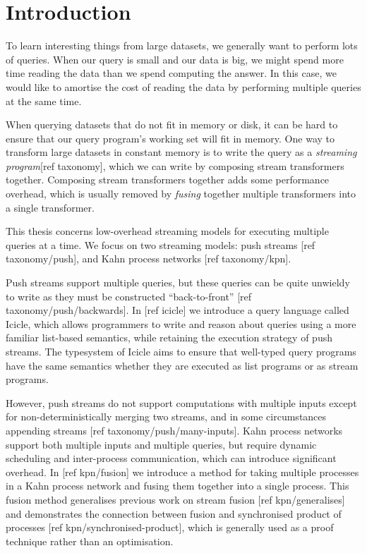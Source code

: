 \chapter{Introduction}
\label{introduction}
To learn interesting things from large datasets, we generally want to perform lots of queries.
When our query is small and our data is big, we might spend more time reading the data than we spend computing the answer.
In this case, we would like to amortise the cost of reading the data by performing multiple queries at the same time.

When querying datasets that do not fit in memory or disk, it can be hard to ensure that our query program's working set will fit in memory.
One way to transform large datasets in constant memory is to write the query as a \emph{streaming program}[ref taxonomy], which we can write by composing stream transformers together.
Composing stream transformers together adds some performance overhead, which is usually removed by \emph{fusing} together multiple transformers into a single transformer.


This thesis concerns low-overhead streaming models for executing multiple queries at a time.
We focus on two streaming models: push streams [ref taxonomy/push], and Kahn process networks [ref taxonomy/kpn].

Push streams support multiple queries, but these queries can be quite unwieldy to write as they must be constructed ``back-to-front'' [ref taxonomy/push/backwards].
In [ref icicle] we introduce a query language called Icicle, which allows programmers to write and reason about queries using a more familiar list-based semantics, while retaining the execution strategy of push streams.
The typesystem of Icicle aims to ensure that well-typed query programs have the same semantics whether they are executed as list programs or as stream programs.

However, push streams do not support computations with multiple inputs except for non-deterministically merging two streams, and in some circumstances appending streams [ref taxonomy/push/many-inputs].
Kahn process networks support both multiple inputs and multiple queries, but require dynamic scheduling and inter-process communication, which can introduce significant overhead.
In [ref kpn/fusion] we introduce a method for taking multiple processes in a Kahn process network and fusing them together into a single process.
This fusion method generalises previous work on stream fusion [ref kpn/generalises] and demonstrates the connection between fusion and synchronised product of processes [ref kpn/synchronised-product], which is generally used as a proof technique rather than an optimisation.

